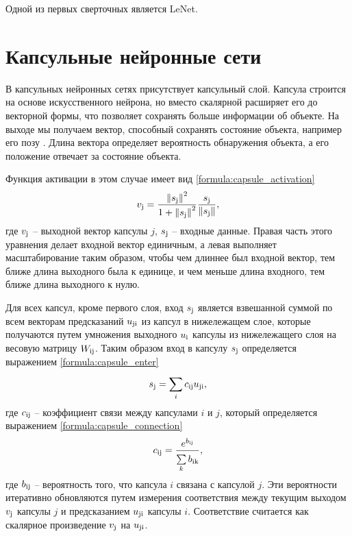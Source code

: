 Одной из первых сверточных является LeNet.



\section{Капсульные нейронные сети}

В капсульных нейронных сетях присутствует капсульный слой. Капсула строится на основе искусственного нейрона, но вместо скалярной расширяет его до векторной формы, что позволяет сохранять больше информации об объекте. На выходе мы получаем вектор, способный сохранять состояние объекта, например его позу \cite{capsule2}. Длина вектора определяет вероятность обнаружения объекта, а его положение отвечает за состояние объекта.

Функция активации в этом случае имеет вид \ref{formula:capsule_activation}
\begin{equation}\label{formula:capsule_activation}
v_{\rm{j}} = \frac{\left\| s_{\rm{j}} \right\|^2}{1 + \left\| s_{\rm{j}} \right\|^2} \frac{s_{\rm{j}}}{\left\| s_{\rm{j}} \right\|},
\end{equation}
где $v_{\rm{j}}$ -- выходной вектор капсулы $j$, $s_{\rm{j}}$ -- входные данные. Правая часть этого уравнения делает входной вектор единичным, а левая выполняет масштабирование таким образом, чтобы чем длиннее был входной вектор, тем ближе длина выходного была к единице, и чем меньше длина входного, тем ближе длина выходного к нулю.

Для всех капсул, кроме первого слоя, вход $s_{\rm{j}}$ является взвешанной суммой по всем векторам предсказаний $u_{\rm{ji}}$ из капсул в нижележащем слое, которые получаются путем умножения выходного $u_{\rm{i}}$ капсулы из нижележащего слоя на весовую матрицу $W_{\rm{ij}}$. Таким образом вход в капсулу $s_{\rm{j}}$ определяется выражением \ref{formula:capsule_enter}
\begin{equation}\label{formula:capsule_enter}
s_{\rm{j}} = \sum\limits_{i}^{}c_{\rm{ij}}u_{\rm{ji}},
\end{equation}
где $c_{\rm{ij}}$ -- коэффициент связи между капсулами $i$ и $j$, который определяется выражением \ref{formula:capsule_connection}
\begin{equation}\label{formula:capsule_connection}
c_{\rm{ij}} = \frac{e^{b_{\rm{ij}}}}{\sum\limits_{k}^{}b_{\rm{ik}}},
\end{equation}
где $b_{\rm{ij}}$ -- вероятность того, что капсула $i$ связана с капсулой $j$. Эти вероятности итеративно обновляются путем измерения соответствия между текущим выходом $v_{\rm{j}}$ капсулы $j$ и предсказанием $u_{\rm{ji}}$ капсулы $i$. Соответствие считается как скалярное произведение $v_{\rm{j}}$ на $u_{\rm{ji}}$.

